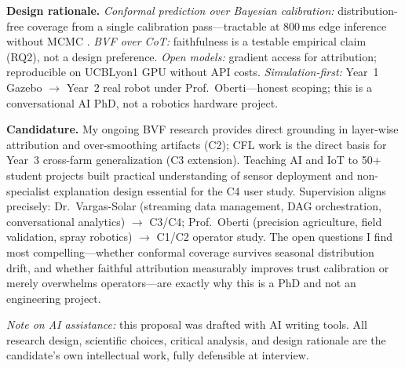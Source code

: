 \documentclass[11pt,a4paper]{article}
\begin{document}
\textbf{Design rationale.}
\textit{Conformal prediction over Bayesian calibration:} distribution-free coverage from a single calibration pass---tractable at 800\,ms edge inference without MCMC \citep{angelopoulos_2023,shafer_vovk_2008}.
\textit{BVF over CoT:} faithfulness is a testable empirical claim (RQ2), not a design preference.
\textit{Open models:} gradient access for attribution; reproducible on UCBLyon1 GPU without API costs.
\textit{Simulation-first:} Year~1 Gazebo $\to$ Year~2 real robot under Prof.\ Oberti---honest scoping; this is a conversational AI PhD, not a robotics hardware project.

\textbf{Candidature.}
My ongoing BVF research \citep{saha_bvf_2026} provides direct grounding in layer-wise attribution and over-smoothing artifacts (C2); CFL work \citep{saha_cfl_2024} is the direct basis for Year~3 cross-farm generalization (C3 extension).
Teaching AI and IoT to 50+ student projects built practical understanding of sensor deployment and non-specialist explanation design essential for the C4 user study.
Supervision aligns precisely: Dr.\ Vargas-Solar (streaming data management, DAG orchestration, conversational analytics) $\to$ C3/C4; Prof.\ Oberti (precision agriculture, field validation, spray robotics) $\to$ C1/C2 operator study.
The open questions I find most compelling---whether conformal coverage survives seasonal distribution drift, and whether faithful attribution measurably improves trust calibration or merely overwhelms operators---are exactly why this is a PhD and not an engineering project.

\textit{Note on AI assistance:} this proposal was drafted with AI writing tools. All research design, scientific choices, critical analysis, and design rationale are the candidate's own intellectual work, fully defensible at interview.



\end{document}
